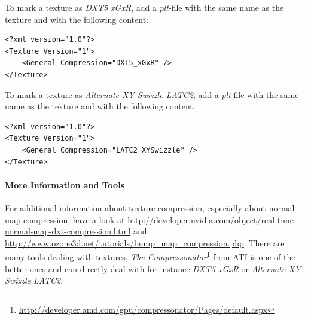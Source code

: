 To mark a texture as \emph{DXT5 xGxR}, add a \emph{plt}-file with the same name as the texture and with the following content:
\begin{lstlisting}[caption=\emph{plt}-file \emph{DXT5 xGxR} normal map compression]
<?xml version="1.0"?>
<Texture Version="1">
	<General Compression="DXT5_xGxR" />
</Texture>
\end{lstlisting}

To mark a texture as \emph{Alternate XY Swizzle LATC2}, add a \emph{plt}-file with the same name as the texture and with the following content:
\begin{lstlisting}[caption=\emph{plt}-file \emph{Alternate XY Swizzle LATC2} normal map compression]
<?xml version="1.0"?>
<Texture Version="1">
	<General Compression="LATC2_XYSwizzle" />
</Texture>
\end{lstlisting}


\paragraph{More Information and Tools}
For additional information about texture compression, especially about normal map compression, have a look at 
\url{http://developer.nvidia.com/object/real-time-normal-map-dxt-compression.html} and \url{http://www.ozone3d.net/tutorials/bump_map_compression.php}.
There are many tools dealing with textures, \emph{The Compressonator}\footnote{\url{http://developer.amd.com/gpu/compressonator/Pages/default.aspx}} from ATI is one of the better ones and can directly deal with for instance \emph{DXT5 xGxR} or \emph{Alternate XY Swizzle LATC2}.
